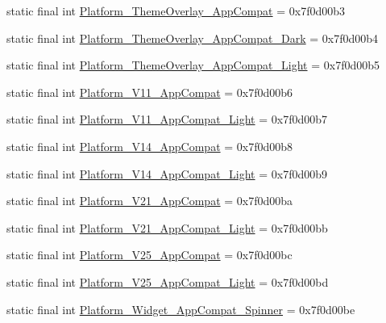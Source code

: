 \begin{DoxyCompactItemize}
\item 
static final int \mbox{\hyperlink{classandroid_1_1support_1_1design_1_1R_1_1style_a174877dc3fe691299685c566a680f6dd}{Platform\+\_\+\+Theme\+Overlay\+\_\+\+App\+Compat}} = 0x7f0d00b3
\item 
static final int \mbox{\hyperlink{classandroid_1_1support_1_1design_1_1R_1_1style_addbc8b61ae0af4b936ddbeb11b8eb1a9}{Platform\+\_\+\+Theme\+Overlay\+\_\+\+App\+Compat\+\_\+\+Dark}} = 0x7f0d00b4
\item 
static final int \mbox{\hyperlink{classandroid_1_1support_1_1design_1_1R_1_1style_a2a388b085535b1ef7e8936d787749259}{Platform\+\_\+\+Theme\+Overlay\+\_\+\+App\+Compat\+\_\+\+Light}} = 0x7f0d00b5
\item 
static final int \mbox{\hyperlink{classandroid_1_1support_1_1design_1_1R_1_1style_a120476555f0826a53df3beb963a46a01}{Platform\+\_\+\+V11\+\_\+\+App\+Compat}} = 0x7f0d00b6
\item 
static final int \mbox{\hyperlink{classandroid_1_1support_1_1design_1_1R_1_1style_a9e3ffa0fb76a607fdfff5eee8278854d}{Platform\+\_\+\+V11\+\_\+\+App\+Compat\+\_\+\+Light}} = 0x7f0d00b7
\item 
static final int \mbox{\hyperlink{classandroid_1_1support_1_1design_1_1R_1_1style_a77d8769a1cbbb334311adcadf62a19e4}{Platform\+\_\+\+V14\+\_\+\+App\+Compat}} = 0x7f0d00b8
\item 
static final int \mbox{\hyperlink{classandroid_1_1support_1_1design_1_1R_1_1style_a01708d63b302bcd3f6f55609289ab28e}{Platform\+\_\+\+V14\+\_\+\+App\+Compat\+\_\+\+Light}} = 0x7f0d00b9
\item 
static final int \mbox{\hyperlink{classandroid_1_1support_1_1design_1_1R_1_1style_a40327e4c66ec6572714bb9b8e081d2c9}{Platform\+\_\+\+V21\+\_\+\+App\+Compat}} = 0x7f0d00ba
\item 
static final int \mbox{\hyperlink{classandroid_1_1support_1_1design_1_1R_1_1style_ab1504214ab2f11159cda855bf4e40920}{Platform\+\_\+\+V21\+\_\+\+App\+Compat\+\_\+\+Light}} = 0x7f0d00bb
\item 
static final int \mbox{\hyperlink{classandroid_1_1support_1_1design_1_1R_1_1style_a284efe44537e37f4ce10bd6560537fcb}{Platform\+\_\+\+V25\+\_\+\+App\+Compat}} = 0x7f0d00bc
\item 
static final int \mbox{\hyperlink{classandroid_1_1support_1_1design_1_1R_1_1style_a6d9bacc24798fbed1801933f6281fb34}{Platform\+\_\+\+V25\+\_\+\+App\+Compat\+\_\+\+Light}} = 0x7f0d00bd
\item 
static final int \mbox{\hyperlink{classandroid_1_1support_1_1design_1_1R_1_1style_a4023bb1017cc57b6f31dd09e187377e9}{Platform\+\_\+\+Widget\+\_\+\+App\+Compat\+\_\+\+Spinner}} = 0x7f0d00be

\end{DoxyCompactItemize}
